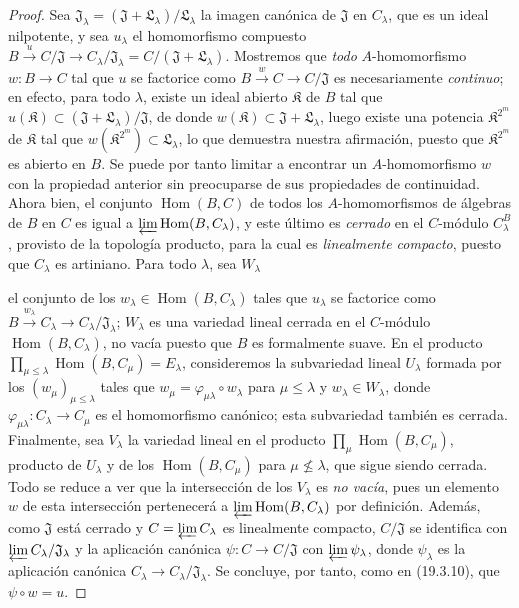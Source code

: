 \begin{proof}
Sea $\mathfrak J_\lambda=(\mathfrak J+\mathfrak L_\lambda)/\mathfrak L_\lambda$
la imagen canónica de $\mathfrak J$ en $C_\lambda$, que es un ideal
nilpotente, y sea $u_\lambda$ el homomorfismo compuesto
$B\xrightarrow{u}C/\mathfrak J\to C_\lambda/\mathfrak J_\lambda
=C/(\mathfrak J+\mathfrak L_\lambda)$. Mostremos que \emph{todo}
$A$-homomorfismo $w:B\to C$ tal que $u$ se factorice como
$B\xrightarrow{w}C\to C/\mathfrak J$ es necesariamente \emph{continuo}; en
efecto, para todo $\lambda$, existe un ideal abierto $\mathfrak K$ de $B$
tal que $u(\mathfrak K)\subset
(\mathfrak J+\mathfrak L_\lambda)/\mathfrak J$, de donde
$w(\mathfrak K)\subset\mathfrak J+\mathfrak L_\lambda$, luego existe
una potencia $\mathfrak K^{2^m}$ de $\mathfrak K$ tal que
$w(\mathfrak K^{2^m})\subset\mathfrak L_\lambda$, lo que demuestra
nuestra afirmación, puesto que $\mathfrak K^{2^m}$ es abierto en $B$. Se puede
por tanto limitar a encontrar un $A$-homomorfismo $w$ con la propiedad anterior
sin preocuparse de sus propiedades de continuidad. Ahora bien, el conjunto
$\operatorname{Hom}(B,C)$ de todos los $A$-homomorfismos de álgebras de $B$
en $C$ es igual a
$\varprojlim\operatorname{Hom}(B,C_\lambda)$, y este último es
\emph{cerrado} en el $C$-módulo $C_\lambda^B$, provisto de la topología
producto, para la cual es \emph{linealmente compacto}, puesto que
  $C_\lambda$ es artiniano. Para todo $\lambda$, sea $W_\lambda$


el conjunto de los $w_\lambda\in\operatorname{Hom}(B,C_\lambda)$ tales que
$u_\lambda$ se factorice como
$B\xrightarrow{w_\lambda}C_\lambda\to
C_\lambda/\mathfrak J_\lambda$; $W_\lambda$ es una variedad
lineal cerrada en el $C$-módulo
  $\operatorname{Hom}(B,C_\lambda)$, no vacía puesto que $B$ es formalmente
  suave. En el producto
$\prod_{\mu\leq\lambda}\operatorname{Hom}(B,C_\mu)=E_\lambda$,
consideremos la subvariedad lineal $U_\lambda$ formada por los
$(w_\mu)_{\mu\leq\lambda}$ tales que
$w_\mu=\varphi_{\mu\lambda}\circ w_\lambda$ para
$\mu\leq\lambda$ y $w_\lambda\in W_\lambda$, donde
$\varphi_{\mu\lambda}:C_\lambda\to C_\mu$ es
el homomorfismo canónico; esta subvariedad también es cerrada. Finalmente, sea $V_\lambda$
la variedad lineal en el producto
$\prod_\mu\operatorname{Hom}(B,C_\mu)$, producto de $U_\lambda$
y de los $\operatorname{Hom}(B,C_\mu)$ para
$\mu\not\leq\lambda$, que sigue siendo cerrada. Todo se reduce a ver que
la intersección de los $V_\lambda$ es \emph{no vacía}, pues un elemento $w$ de
esta intersección pertenecerá a
$\varprojlim\operatorname{Hom}(B,C_\lambda)$ por definición.
Además, como $\mathfrak J$ está cerrado y
$C=\varprojlim C_\lambda$ es linealmente compacto,
$C/\mathfrak J$ se identifica con
$\varprojlim C_\lambda/\mathfrak J_\lambda$ y
la aplicación canónica $\psi:C\to C/\mathfrak J$ con
$\varprojlim\psi_\lambda$, donde $\psi_\lambda$ es
la aplicación canónica
$C_\lambda\to C_\lambda/\mathfrak J_\lambda$. Se concluye, por tanto,
como en (19.3.10), que $\psi\circ w=u$.
\end{proof}

